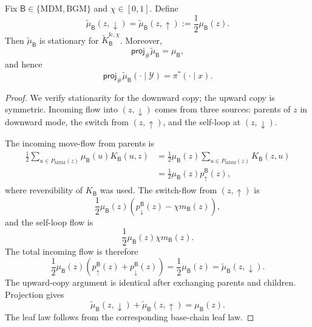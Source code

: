 \documentclass{article}
\numberwithin{theorem}{section}
\numberwithin{proposition}{section}
\numberwithin{corollary}{section}
\numberwithin{lemma}{section}
\numberwithin{conjecture}{section}
\numberwithin{remark}{section}
\numberwithin{definition}{section}
\numberwithin{assumption}{section}
\numberwithin{example}{section}
\newcommand{\calY}{{\mathcal{Y}}}
\newcommand{\sbra}[1]{\left(#1\right)}
\begin{document}
\begin{theorem}
\label{thm:generic_mdm_momentum_stationarity}
\label{thm:balanced_mdm_momentum_stationarity}
Fix $\mathsf B\in\{\mathrm{MDM},\mathrm{BGM}\}$ and $\chi\in[0,1]$. Define
\begin{equation*}
    \widetilde\mu_{\mathsf B}(z,\downarrow)=\widetilde\mu_{\mathsf B}(z,\uparrow):=\frac12\mu_{\mathsf B}(z).
\end{equation*}
Then $\widetilde\mu_{\mathsf B}$ is stationary for $\widetilde K_{\mathsf B}^{\mathrm{fc},\chi}$. Moreover,
\begin{equation*}
    \textsf{proj}_{\#}\widetilde\mu_{\mathsf B}=\mu_{\mathsf B},
\end{equation*}
and hence
\begin{equation*}
    \textsf{proj}_{\#}\widetilde\mu_{\mathsf B}(\cdot\mid\calY)=\pi^*(\cdot\mid x).
\end{equation*}
\end{theorem}

\begin{proof}
We verify stationarity for the downward copy; the upward copy is symmetric. Incoming flow into $(z,\downarrow)$ comes from three sources: parents of $z$ in downward mode, the switch from $(z,\uparrow)$, and the self-loop at $(z,\downarrow)$.

The incoming move-flow from parents is
\begin{align*}
    \frac12\sum_{u\in P_{\mathrm{MDM}}(z)}\mu_{\mathsf B}(u)K_{\mathsf B}(u,z)
    &=\frac12\mu_{\mathsf B}(z)\sum_{u\in P_{\mathrm{MDM}}(z)}K_{\mathsf B}(z,u)\\
    &=\frac12\mu_{\mathsf B}(z)p_{\uparrow}^{\mathsf B}(z),
\end{align*}
where reversibility of $K_{\mathsf B}$ was used. The switch-flow from $(z,\uparrow)$ is
\begin{equation*}
    \frac12\mu_{\mathsf B}(z)\sbra{p_{\downarrow}^{\mathsf B}(z)-\chi m_{\mathsf B}(z)},
\end{equation*}
and the self-loop flow is
\begin{equation*}
    \frac12\mu_{\mathsf B}(z)\chi m_{\mathsf B}(z).
\end{equation*}
The total incoming flow is therefore
\begin{equation*}
    \frac12\mu_{\mathsf B}(z)\sbra{p_{\uparrow}^{\mathsf B}(z)+p_{\downarrow}^{\mathsf B}(z)}
    =\frac12\mu_{\mathsf B}(z)=\widetilde\mu_{\mathsf B}(z,\downarrow).
\end{equation*}
The upward-copy argument is identical after exchanging parents and children. Projection gives
\begin{equation*}
    \widetilde\mu_{\mathsf B}(z,\downarrow)+\widetilde\mu_{\mathsf B}(z,\uparrow)=\mu_{\mathsf B}(z).
\end{equation*}
The leaf law follows from the corresponding base-chain leaf law.
\end{proof}
\end{document}

